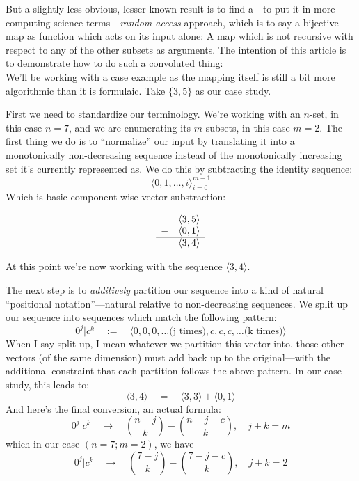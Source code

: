 \documentclass[twoside]{article}
\begin{document}
But a slightly less obvious, lesser known result is to find a---to put it in more computing science terms---\emph{random access}
approach, which is to say a bijective map as function which acts on its input alone: A map which is not recursive with respect
to any of the other subsets as arguments.  The intention of this article is to demonstrate how to do such a convoluted thing:\\[0.1cm]

We'll be working with a case example as the mapping itself is still a bit more algorithmic than it is formulaic.
Take $ \{3, 5\} $ as our case study.

First we need to standardize our terminology. We're working with an $ n $-set, in this case $ n=7 $, and we are enumerating its
$ m $-subsets, in this case $ m=2 $.  The first thing we do is to ``normalize'' our input by translating it into a monotonically
non-decreasing sequence instead of the monotonically increasing set it's currently represented as. We do this by subtracting
the identity sequence:
$$ \langle 0, 1,\ldots, i\rangle_{i=0}^{m-1} $$
Which is basic component-wise vector substraction:

$$ \begin{array}{rc}
  & \langle 3, 5\rangle  \\
- & \langle 0, 1\rangle  \\ \hline
  & \langle 3, 4\rangle
\end{array} $$

At this point we're now working with the sequence $ \langle 3, 4\rangle  $.

The next step is to \emph{additively} partition our sequence into a kind of natural ``positional notation''---natural relative
to non-decreasing sequences. We split up our sequence into sequences which match the following pattern:
$$ 0^j|c^k\quad :=\quad\langle 0, 0, 0,\ldots\mbox{(j times)}, c, c, c,\ldots\mbox{(k times)}\rangle $$
When I say split up, I mean whatever we partition this vector into, those other vectors (of the same dimension) must add back
up to the original---with the additional constraint that each partition follows the above pattern. In our case study, this leads to:
$$ \langle 3, 4\rangle \quad =\quad\langle 3, 3\rangle +\langle 0, 1\rangle $$
And here's the final conversion, an actual formula:
$$ 0^j|c^k\quad\to\quad {n-j\choose k}-{n-j-c\choose k},\quad j+k=m $$
which in our case $ (n=7; m=2) $, we have
$$ 0^j|c^k\quad\to\quad {7-j\choose k}-{7-j-c\choose k},\quad j+k=2 $$
\end{document}
